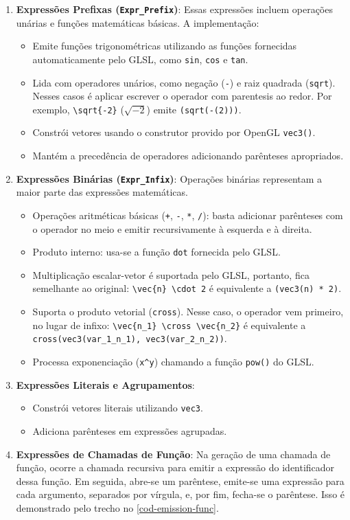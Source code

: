 \begin{enumerate}
    \item \textbf{Expressões Prefixas (\texttt{Expr\_Prefix})}:
    Essas expressões incluem operações unárias e funções matemáticas básicas. A implementação:
    \begin{itemize}
        \item Emite funções trigonométricas utilizando as funções fornecidas automaticamente pelo GLSL, como \verb|sin|, \verb|cos| e \verb|tan|.
        \item Lida com operadores unários, como negação (\verb|-|) e raiz quadrada (\verb|sqrt|). Nesses casos é aplicar escrever o operador com parentesis ao redor. Por exemplo, \verb"\sqrt{-2}" ($\sqrt{-2}$) emite \verb"(sqrt(-(2)))".
        \item Constrói vetores usando o construtor provido por OpenGL \verb|vec3()|.
        \item Mantém a precedência de operadores adicionando parênteses apropriados.
    \end{itemize}

    \item \textbf{Expressões Binárias (\texttt{Expr\_Infix})}:
    Operações binárias representam a maior parte das expressões matemáticas.
    \begin{itemize}
    \item Operações aritméticas básicas (\verb|+|, \verb|-|, \verb|*|, \verb|/|): basta adicionar parênteses com o operador no meio e emitir recursivamente à esquerda e à direita.
    \item Produto interno: usa-se a função \verb|dot| fornecida pelo GLSL.
    \item Multiplicação escalar-vetor é suportada pelo GLSL, portanto, fica semelhante ao original: \verb|\vec{n} \cdot 2| é equivalente a \verb|(vec3(n) * 2)|.
    \item Suporta o produto vetorial (\verb|cross|). Nesse caso, o operador vem primeiro, no lugar de infixo: \verb|\vec{n_1} \cross \vec{n_2}| é equivalente a \verb|cross(vec3(var_1_n_1), vec3(var_2_n_2))|.
    \item Processa exponenciação (\verb|x^y|) chamando a função \verb|pow()| do GLSL.
    \end{itemize}

    \item \textbf{Expressões Literais e Agrupamentos}:
    \begin{itemize}
        \item Constrói vetores literais utilizando \verb|vec3|.
        \item Adiciona parênteses em expressões agrupadas.
    \end{itemize}

    \item \textbf{Expressões de Chamadas de Função}:
       Na geração de uma chamada de função, ocorre a chamada recursiva para emitir a expressão do identificador dessa função. Em seguida, abre-se um parêntese, emite-se uma expressão para cada argumento, separados por vírgula, e, por fim, fecha-se o parêntese. Isso é demonstrado pelo trecho no \autoref{cod-emission-func}.

\end{enumerate}

